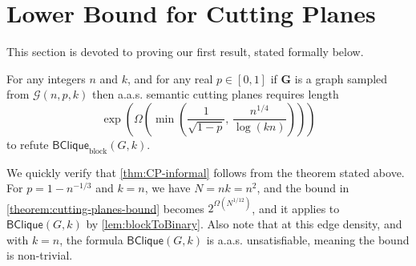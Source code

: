 \documentclass[10pt,a4paper]{article}
\makeatletter
\theoremstyle{definition}
\theoremstyle{remark}
\theoremstyle{example}
\theoremstyle{plain}
\newcommand{\calG}{\mathcal{G}}
\newcommand{\binClique}[2]{\mathsf{BClique}({#1}, {#2})}
\newcommand{\binCliqueGk}{\binClique{G}{k}}
\newcommand{\binCliqueBlock}[2]{\mathsf{BClique}_{\textrm{block}}({#1}, {#2})}
\newcommand{\binCliqueBlockGk}{\binCliqueBlock{G}{k}}
\newcommand{\graphSize}{N}
\newcommand{\aas}{a.a.s.\@\xspace}
\makeatother
\begin{document}
\section{Lower Bound for Cutting Planes} \label{sec:binCliqueDagCP}

\newcommand{\protocol}{\Pi}
\newcommand{\bw}{\mathsf{bw}}


This section is devoted to proving our first result, stated formally below.
\begin{theorem}
    For any  
    integers $n$ and $k$, and for any real $p \in [0,1]$
    if $\bm G$ is a graph sampled from $\calG(n,p,k)$ then \aas semantic cutting planes requires length 
    \begin{equation*}
        \exp\left({\Omega\left({\min\left(
    \frac{1}{\sqrt{1-p}},
    \,
    \frac{n^{1/4}}{\log(kn)}\right)}\right)}\right)
    \end{equation*}
    to refute $\binCliqueBlockGk$.%
    \label{theorem:cutting-planes-bound}
\end{theorem}
We quickly verify that \autoref{thm:CP-informal} follows from the theorem stated above. For $p=1-n^{-1/3}$ and $k = n$, we have $\graphSize=nk=n^2$, and the bound in \autoref{theorem:cutting-planes-bound} becomes $2^{\Omega(\graphSize^{1/12})}$, 
   and it applies to $\binCliqueGk$ by \autoref{lem:blockToBinary}. Also note that at this edge density, and with $k=n$, the formula $\binCliqueGk$ is \aas unsatisfiable, meaning the bound is non-trivial. 
\end{document}
